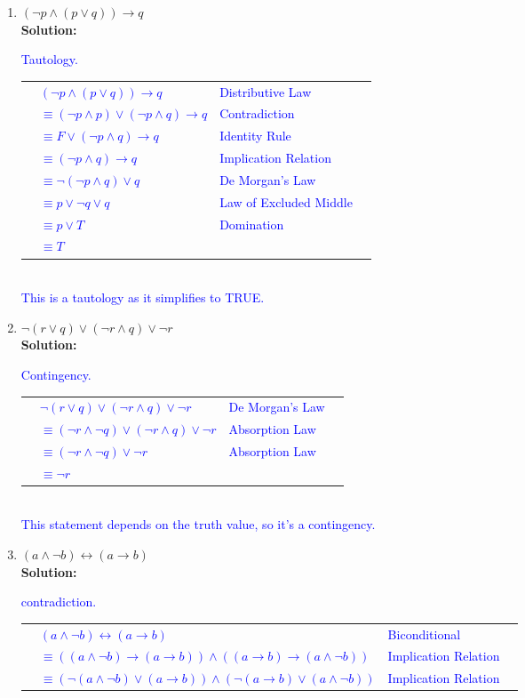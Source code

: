 \documentclass{article}
\renewcommand{\implies}{\rightarrow}
\newcommand{\sol}[1]{\textbf{Solution:\,}\textcolor{blue}{#1}}
\begin{document}
\begin{enumerate}
\begin{enumerate}
\item $(\neg p \land (p \lor q)) \implies q$
\\\sol{Tautology.
\\\begin{tabular}{llll}
&\quad$(\neg p \land (p \lor q))\implies q$&Distributive Law\\
&$\equiv (\neg p \land p) \lor(\neg p \land q)\implies q$ &Contradiction\\
&$\equiv F \lor (\neg p \land q) \implies q$&Identity Rule\\
&$\equiv (\neg p \land q) \implies q$&Implication Relation\\
&$\equiv \neg(\neg p \land q) \lor q$&De Morgan's Law\\
&$\equiv p \lor \neg q \lor q$& Law of Excluded Middle\\
&$\equiv p \lor T$&Domination\\
&$\equiv T$&\\
\end{tabular}
\\This is a tautology as it simplifies to TRUE.}
\item $\neg (r \lor q)  \lor (\neg r \land q) \lor \neg r $
\\\sol{Contingency.
\\\begin{tabular}{llll}
&\quad$\neg (r \lor q)  \lor (\neg r \land q) \lor \neg r $&De Morgan's Law\\
&$\equiv(\neg r \land \neg q)  \lor (\neg r \land q) \lor \neg r $&Absorption Law\\
&$\equiv(\neg r \land \neg q) \lor \neg r $&Absorption Law\\
&$\equiv\neg r$&\\
\end{tabular}
\\This statement depends on the truth value, so it's a contingency.}
\item $(a \land \neg b) \leftrightarrow (a \rightarrow b)$
\\\sol{contradiction.
\\\begin{tabular}{llll}
&\quad$(a \land \neg b) \leftrightarrow (a \rightarrow b)$&Biconditional\\
&$\equiv((a \land \neg b)\implies(a \rightarrow b))\land((a \rightarrow b)\implies(a \land \neg b))$&Implication Relation\\
&$\equiv(\neg(a \land \neg b)\lor(a \rightarrow b))\land(\neg(a \rightarrow b)\lor(a \land \neg b))$&Implication Relation\\

\end{tabular}}
\end{enumerate}
\end{enumerate}
\end{document}
